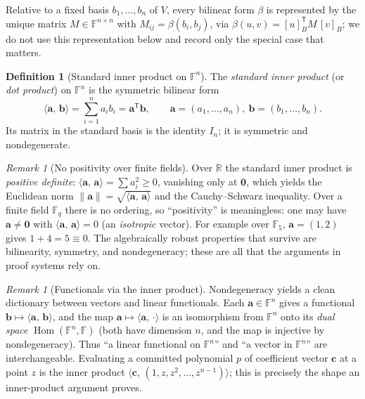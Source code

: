 \documentclass[11pt,a4paper]{article}
\theoremstyle{definition}
\newtheorem{definition}[theorem]{Definition}
\theoremstyle{remark}
\newtheorem{remark}[theorem]{Remark}
\newcommand{\R}{\ensuremath{\mathbb{R}}}
\newcommand{\F}{\ensuremath{\mathbb{F}}}
\newcommand{\Fq}{\ensuremath{\mathbb{F}_{q}}}
\newcommand{\ip}[2]{\langle #1,\, #2 \rangle}
\DeclareMathOperator{\Hom}{Hom}
\begin{document}
Relative to a fixed basis \(b_1, \dots, b_n\) of \(V\), every bilinear form \(\beta\) is represented by the unique matrix \(M \in \F^{n \times n}\) with \(M_{ij} = \beta(b_i, b_j)\), via \(\beta(u,v) = [u]_B^{\mathsf T} M\, [v]_B\); we do not use this representation below and record only the special case that matters.

\begin{definition}[Standard inner product on \(\F^n\)]\label{linalg:def-stdip}
The \emph{standard inner product} (or \emph{dot product}) on \(\F^n\) is the symmetric bilinear form
\[
\ip{\mathbf a}{\mathbf b} = \sum_{i=1}^n a_i b_i = \mathbf a^{\mathsf T}\mathbf b,
\qquad \mathbf a = (a_1,\dots,a_n),\ \mathbf b = (b_1,\dots,b_n).
\]
Its matrix in the standard basis is the identity \(I_n\); it is symmetric and nondegenerate.
\end{definition}

\begin{remark}[No positivity over finite fields]\label{linalg:rem-no-positivity}
Over \(\R\) the standard inner product is \emph{positive definite}: \(\ip{\mathbf a}{\mathbf a} = \sum a_i^2 \ge 0\), vanishing only at \(\mathbf 0\), which yields the Euclidean norm \(\|\mathbf a\| = \sqrt{\ip{\mathbf a}{\mathbf a}}\) and the Cauchy--Schwarz inequality. Over a finite field \(\Fq\) there is no ordering, so ``positivity'' is meaningless: one may have \(\mathbf a \neq \mathbf 0\) with \(\ip{\mathbf a}{\mathbf a} = 0\) (an \emph{isotropic} vector). For example over \(\F_5\), \(\mathbf a = (1,2)\) gives \(1 + 4 = 5 \equiv 0\). The algebraically robust properties that survive are bilinearity, symmetry, and nondegeneracy; these are all that the arguments in proof systems rely on.
\end{remark}

\begin{remark}[Functionals via the inner product]\label{linalg:rem-riesz}
Nondegeneracy yields a clean dictionary between vectors and linear functionals. Each \(\mathbf a \in \F^n\) gives a functional \(\mathbf b \mapsto \ip{\mathbf a}{\mathbf b}\), and the map \(\mathbf a \mapsto \ip{\mathbf a}{\cdot}\) is an isomorphism from \(\F^n\) onto its \emph{dual space} \(\Hom(\F^n, \F)\) (both have dimension \(n\), and the map is injective by nondegeneracy). Thus ``a linear functional on \(\F^n\)'' and ``a vector in \(\F^n\)'' are interchangeable. Evaluating a committed polynomial \(p\) of coefficient vector \(\mathbf c\) at a point \(z\) is the inner product \(\ip{\mathbf c}{(1, z, z^2, \dots, z^{n-1})}\); this is precisely the shape an inner-product argument proves.
\end{remark}
\end{document}
